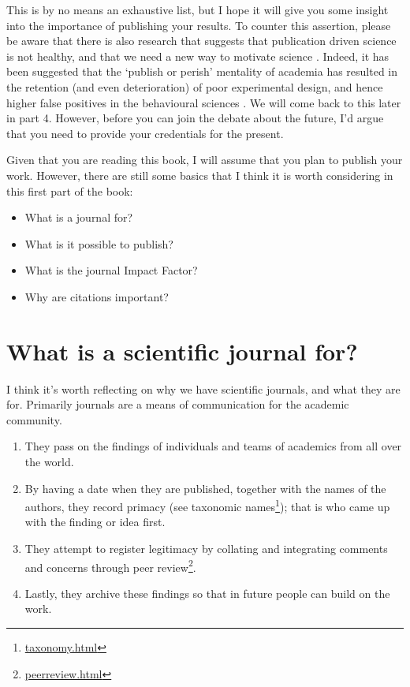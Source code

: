 \documentclass[
]{krantz}
\providecommand{\tightlist}{%
  \setlength{\itemsep}{0pt}\setlength{\parskip}{0pt}}
\renewcommand{\href}[2]{#2\footnote{\url{#1}}}
\begin{document}
This is by no means an exhaustive list, but I hope it will give you some insight into the importance of publishing your results. To counter this assertion, please be aware that there is also research that suggests that publication driven science is not healthy, and that we need a new way to motivate science \citep[e.g.][]{stergiou2014impact}. Indeed, it has been suggested that the `publish or perish' mentality of academia has resulted in the retention (and even deterioration) of poor experimental design, and hence higher false positives in the behavioural sciences \citep{smaldino2016natural}. We will come back to this later in part 4. However, before you can join the debate about the future, I'd argue that you need to provide your credentials for the present.

Given that you are reading this book, I will assume that you plan to publish your work. However, there are still some basics that I think it is worth considering in this first part of the book:

\begin{itemize}
\tightlist
\item
  What is a journal for?
\item
  What is it possible to publish?
\item
  What is the journal Impact Factor?
\item
  Why are citations important?
\end{itemize}

\hypertarget{whatjournalfor}{%
\chapter{What is a scientific journal for?}\label{whatjournalfor}}

I think it's worth reflecting on why we have scientific journals, and what they are for. Primarily journals are a means of communication for the academic community.

\begin{enumerate}
\def\labelenumi{\arabic{enumi}.}
\tightlist
\item
  They pass on the findings of individuals and teams of academics from all over the world.
\item
  By having a date when they are published, together with the names of the authors, they record primacy (see \href{taxonomy.html}{taxonomic names}); that is who came up with the finding or idea first.
\item
  They attempt to register legitimacy by collating and integrating comments and concerns through \href{peerreview.html}{peer review}.
\item
  Lastly, they archive these findings so that in future people can build on the work.
\end{enumerate}
\end{document}
